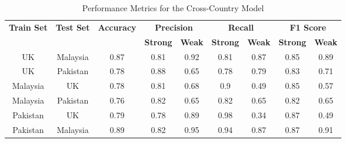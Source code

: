\documentclass[pt]{article}  %
\begin{document}
\begin{table}[H]
\centering
\begin{tabular}{|c|c|c|cc|cc|cc|}
\hline
\textbf{Train Set} & \textbf{Test Set} & \textbf{Accuracy} & \multicolumn{2}{c|}{\textbf{Precision}} & \multicolumn{2}{c|}{\textbf{Recall}} & \multicolumn{2}{c|}{\textbf{F1 Score}} \\ \cline{4-9} 
                   &                   &                   & \textbf{Strong}    & \textbf{Weak}    & \textbf{Strong}   & \textbf{Weak}   & \textbf{Strong}      & \textbf{Weak}     \\ \hline
UK          & Malaysia         & 0.87              & 0.81               & 0.92             & 0.81              & 0.87           & 0.85                & 0.89              \\ \hline
UK         & Pakistan         & 0.78              & 0.88               & 0.65             & 0.78              & 0.79           & 0.83                & 0.71              \\ \hline
Malaysia         & UK        & 0.78              & 0.81               & 0.68             & 0.9              & 0.49            & 0.85                & 0.57              \\ \hline
Malaysia          & Pakistan       & 0.76              & 0.82               & 0.65            & 0.82              & 0.65            & 0.82                & 0.65              \\ \hline
Pakistan         & UK         & 0.79              & 0.78               & 0.89             & 0.98              & 0.34            & 0.87                & 0.49              \\ \hline
Pakistan         & Malaysia        & 0.89              & 0.82               & 0.95             & 0.94              & 0.87            & 0.87                & 0.91              \\ \hline
\end{tabular}
\caption{Performance Metrics for the Cross-Country Model}
\label{tab:cross}
\end{table}

\end{document}
